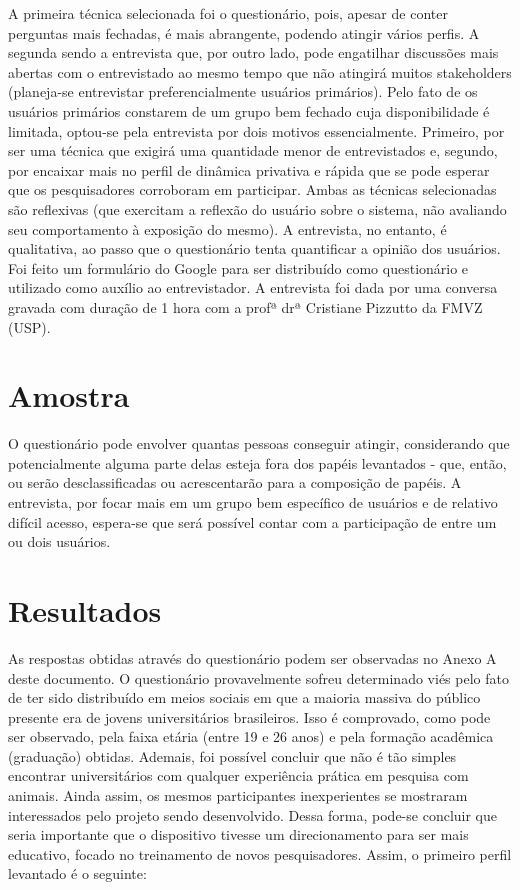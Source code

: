 A primeira técnica selecionada foi o questionário, pois, apesar de conter perguntas mais fechadas, é mais abrangente, podendo atingir vários perfis. A segunda sendo a entrevista que, por outro lado, pode engatilhar discussões mais abertas com o entrevistado ao mesmo tempo que não atingirá muitos stakeholders (planeja-se entrevistar preferencialmente usuários primários).
Pelo fato de os usuários primários constarem de um grupo bem fechado cuja disponibilidade é limitada, optou-se pela entrevista por dois motivos essencialmente. Primeiro, por ser uma técnica que exigirá uma quantidade menor de entrevistados e, segundo, por encaixar mais no perfil de dinâmica privativa e rápida que se pode esperar que os pesquisadores corroboram em participar.
Ambas as técnicas selecionadas são reflexivas (que exercitam a reflexão do usuário sobre o sistema, não avaliando seu comportamento à exposição do mesmo). A entrevista, no entanto, é qualitativa, ao passo que o questionário tenta quantificar a opinião dos usuários.
Foi feito um formulário do Google para ser distribuído como questionário e utilizado como auxílio ao entrevistador. A entrevista foi dada por uma conversa gravada com duração de 1 hora com a profª drª Cristiane Pizzutto da FMVZ (USP).

\section{Amostra}

O questionário pode envolver quantas pessoas conseguir atingir, considerando que potencialmente alguma parte delas esteja fora dos papéis levantados - que, então, ou serão desclassificadas ou acrescentarão para a composição de papéis.
A entrevista, por focar mais em um grupo bem específico de usuários e de relativo difícil acesso, espera-se que será possível contar com a participação de entre um ou dois usuários.

\section{Resultados}

As respostas obtidas através do questionário podem ser observadas no Anexo A deste documento. O questionário provavelmente sofreu determinado viés pelo fato de ter sido distribuído em meios sociais em que a maioria massiva do público presente era de jovens universitários brasileiros. Isso é comprovado, como pode ser observado, pela faixa etária (entre 19 e 26 anos) e pela formação acadêmica (graduação) obtidas.
Ademais, foi possível concluir que não é tão simples encontrar universitários com qualquer experiência prática em pesquisa com animais. Ainda assim, os mesmos participantes inexperientes se mostraram interessados pelo projeto sendo desenvolvido. Dessa forma, pode-se concluir que seria importante que o dispositivo tivesse um direcionamento para ser mais educativo, focado no treinamento de novos pesquisadores.
Assim, o primeiro perfil levantado é o seguinte:

